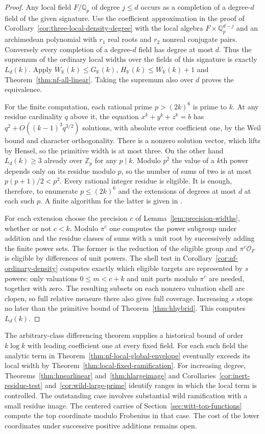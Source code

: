 \documentclass[11pt,letterpaper]{article}
\theoremstyle{definition}
\numberwithin{equation}{section}
\begin{document}
\begin{proof}
Any local field $F/\mathbb Q_p$ of degree $j\le d$ occurs as a
completion of a degree-$d$ field of the given signature. Use the
coefficient approximation in the proof of
Corollary~\ref{cor:three-local-density-degree} with the local algebra
$F\times\mathbb Q_p^{d-j}$ and an archimedean polynomial with
$r_1$ real roots and $r_2$ nonreal conjugate pairs. Conversely every
completion of a degree-$d$ field has degree at most $d$.
Thus the supremum of the ordinary local widths over the fields of
this signature is exactly $L_d(k)$. Apply
$W_{\mathbb K}(k)\le G_{\mathbb K}(k)$,
$H_{\mathbb K}(k)\le W_{\mathbb K}(k)+1$ and
Theorem~\ref{thm:nf-all-linear}. Taking the supremum also over $d$
proves the equivalence.

For the finite computation, each rational prime $p>(2k)^6$ is
prime to $k$. At any residue cardinality $q$ above it, the equation
$x^k+y^k+z^k=b$ has $q^2+O((k-1)^3q^{3/2})$ solutions, with
absolute error coefficient one, by the Weil bound and character
orthogonality. There is a nonzero solution vector, which lifts by
Hensel, so the primitive width is at most three. On the other hand
$L_d(k)\ge3$ already over $\mathbb Z_p$ for any $p\mid k$.
Modulo $p^2$ the value of a $k$th power depends only on its residue
modulo $p$, so the number of sums of two is at most
$p(p+1)/2<p^2$. Every rational integer residue is eligible.
It is enough, therefore, to enumerate $p\le(2k)^6$ and the
extensions of degrees at most $d$ at each such $p$. A finite
algorithm for the latter is given in \cite{NFPauRob}.

For each extension choose the precision $c$ of
Lemma~\ref{lem:precision-widths}, whether or not $c<k$.
Modulo $\pi^c$ one computes the power subgroup under addition and
the residue classes of sums with a unit root by successively adding
the finite power sets. The former is the reduction of the eligible
group and $\pi^c\mathcal O_F$ is eligible by differences of unit
powers. The shell test in Corollary~\ref{cor:nf-ordinary-density}
computes exactly which eligible targets are represented by $s$ powers:
only valuations $0\le m<c+k$ and unit parts modulo $\pi^c$
are needed, together with zero. The resulting subsets on each
nonzero valuation shell are clopen, so full relative measure there
also gives full coverage. Increasing $s$ stops no later than the
primitive bound of Theorem~\ref{thm:hhybrid}. This computes $L_d(k)$.
\end{proof}
The arbitrary-class differencing theorem supplies a historical bound
of order $k\log k$ with leading coefficient one at every fixed field.
For each such field the analytic term in
Theorem~\ref{thm:nf-local-global-envelope} eventually exceeds its local
width by Theorem~\ref{thm:local-fixed-ramification}. For increasing
degree, Theorems~\ref{thm:hnearlinear} and~\ref{thm:hlargeimage}
and Corollaries~\ref{cor:inert-residue-test} and~\ref{cor:wild-large-prime}
identify ranges in which the local term is controlled. The outstanding
case involves substantial wild ramification with a small residue
image. The centered carries of Section~\ref{sec:witt-top-functions}
compute the top coordinate modulo Frobenius in that case. The cost
of the lower coordinates under successive positive additions remains
open.
\end{document}
